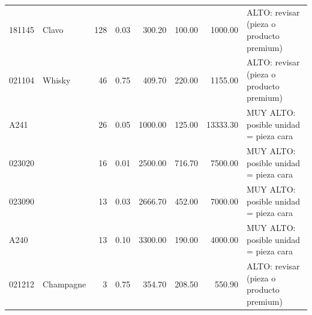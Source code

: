\begin{table}[ht]
\begin{tabular}{llrrrrrl}
  181145 & Clavo & 128 & 0.03 & 300.20 & 100.00 & 1000.00 & ALTO: revisar (pieza o producto premium) \\ 
  021104 & Whisky &  46 & 0.75 & 409.70 & 220.00 & 1155.00 & ALTO: revisar (pieza o producto premium) \\ 
  A241 &  &  26 & 0.05 & 1000.00 & 125.00 & 13333.30 & MUY ALTO: posible unidad = pieza cara \\ 
  023020 &  &  16 & 0.01 & 2500.00 & 716.70 & 7500.00 & MUY ALTO: posible unidad = pieza cara \\ 
  023090 &  &  13 & 0.03 & 2666.70 & 452.00 & 7000.00 & MUY ALTO: posible unidad = pieza cara \\ 
  A240 &  &  13 & 0.10 & 3300.00 & 190.00 & 4000.00 & MUY ALTO: posible unidad = pieza cara \\ 
  021212 & Champagne &   3 & 0.75 & 354.70 & 208.50 & 550.90 & ALTO: revisar (pieza o producto premium) \\ 
   \bottomrule
\end{tabular}
\end{table}
